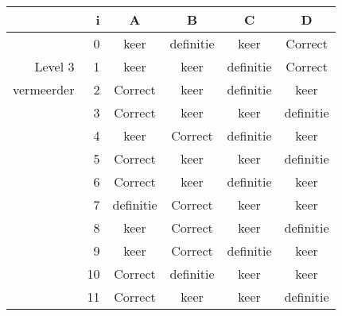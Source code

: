 \begin{tabular}{ rr| c|c|c|c}\hline\hline
     & i & \textbf{A} & \textbf{B} & \textbf{C} & \textbf{D}\\\hline

&0&keer&definitie&keer&Correct\cellcolor[gray]{0.6}\\
Level 3 & 1&keer&keer&definitie&Correct\cellcolor[gray]{0.6}\\
vermeerder &2&Correct\cellcolor[gray]{0.6}&keer&definitie&keer\\
&3&Correct\cellcolor[gray]{0.6}&keer&keer&definitie\\
&4&keer&Correct\cellcolor[gray]{0.6}&definitie&keer\\
&5&Correct\cellcolor[gray]{0.6}&keer&keer&definitie\\
&6&Correct\cellcolor[gray]{0.6}&keer&definitie&keer\\
&7&definitie&Correct\cellcolor[gray]{0.6}&keer&keer\\
&8&keer&Correct\cellcolor[gray]{0.6}&keer&definitie\\
&9&keer&Correct\cellcolor[gray]{0.6}&definitie&keer\\
&10&Correct\cellcolor[gray]{0.6}&definitie&keer&keer\\
&11&Correct\cellcolor[gray]{0.6}&keer&keer&definitie\\
\hline\end{tabular}\par\ \newline

